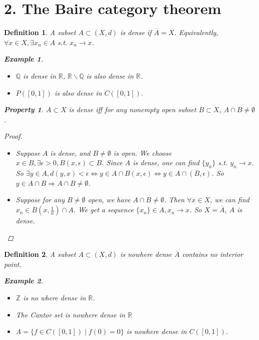 \documentclass{article}
\newtheorem*{property}{Property}
\newtheorem*{definition}{Definition}
\newtheorem*{example}{Example}
\begin{document}
\section*{2. The Baire category theorem}
\begin{definition}
    A subset $A \subset (X, d)$ is dense if $\overline{A} = X$.
    Equivalently, $\forall x \in X, \exists x_n \in A$ s.t. $x_n \rightarrow x$.
    \begin{example} \hfill
        \begin{itemize}
            \item $\mathbb{Q}$ is dense in $\mathbb{R}$, $\mathbb{R} \backslash \mathbb{Q}$ is also dense in $\mathbb{R}$.
            \item $P([0, 1])$ is also dense in $C([0, 1])$.
        \end{itemize}
    \end{example}
    \begin{property}
        $A \subset X$ is dense iff for any nonempty open subset $B \subset X$, $A \cap B \ne \emptyset$.
        \begin{proof} \hfill
            \begin{itemize}
                \item Suppose $A$ is dense, and $B \ne \emptyset$ is open.
                We choose $x \in B, \exists \epsilon > 0, B(x, \epsilon) \subset B$.
                Since $A$ is dense, one can find $\{y_n\}$ s.t. $y_n \rightarrow x$.
                So $\exists y \in A, d(y, x) < \epsilon \Leftrightarrow y \in A \cap B(x, \epsilon) \Leftrightarrow y \in A \cap (B, \epsilon)$.
                So $y \in A \cap B \Rightarrow A \cap B \ne \emptyset$.
                \item Suppose for any $B \ne \emptyset$ open, we have $A \cap B \ne \emptyset$.
                Then $\forall x \in X$, we can find $x_n \in B(x, \frac{1}{n})\cap A$.
                We get a sequence $\{x_n\} \in A, x_n \rightarrow x$. So $X = \overline{A}$, $A$ is dense. 
            \end{itemize}
        \end{proof}
    \end{property}
\end{definition}
\begin{definition}
    A subset $A \subset (X, d)$ is nowhere dense $\overline{A}$ contains no interior point.
    \begin{example} \hfill
        \begin{itemize}
            \item $\mathbb{Z}$ is no where dense in $\mathbb{R}$.
            \item The Cantor set is nowhere dense in $\mathbb{R}$
            \item $A=\{f \in C([0, 1]) \mid f(0) = 0\}$ is nowhere dense in $C([0, 1])$.
        \end{itemize}
    \end{example}
\end{definition}
\end{document}
